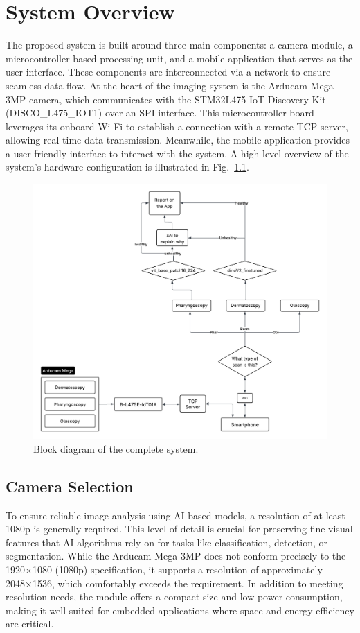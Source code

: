 \chapter{System Overview}

The proposed system is built around three main components: a camera module, a microcontroller-based processing unit, and a mobile application that serves as the user interface. These components are interconnected via a network to ensure seamless data flow. At the heart of the imaging system is the Arducam Mega 3MP camera, which communicates with the STM32L475 IoT Discovery Kit (DISCO\_L475\_IOT1) over an SPI interface. This microcontroller board leverages its onboard Wi-Fi to establish a connection with a remote TCP server, allowing real-time data transmission. Meanwhile, the mobile application provides a user-friendly interface to interact with the system. A high-level overview of the system’s hardware configuration is illustrated in Fig.~\ref{overall}.

\begin{figure}[h!]
  \centering
  \includegraphics[width=0.8\linewidth]{system_diagram.png}
  \caption{Block diagram of the complete system.}
  \label{overall}
\end{figure}

\section{Camera Selection}

To ensure reliable image analysis using AI-based models, a resolution of at least 1080p is generally required. This level of detail is crucial for preserving fine visual features that AI algorithms rely on for tasks like classification, detection, or segmentation. While the Arducam Mega 3MP does not conform precisely to the 1920×1080 (1080p) specification, it supports a resolution of approximately 2048×1536, which comfortably exceeds the requirement. In addition to meeting resolution needs, the module offers a compact size and low power consumption, making it well-suited for embedded applications where space and energy efficiency are critical.

